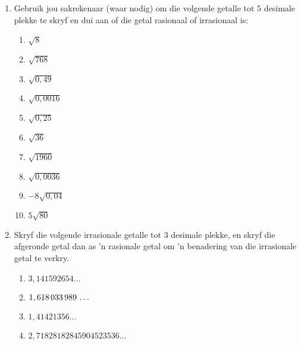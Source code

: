 \begin{eocexercises}{}
\begin{enumerate}[itemsep=5pt, label=\textbf{\arabic*}. ]
\item Gebruik jou sakrekenaar (waar nodig) om die volgende getalle tot  $5$ desimale plekke te skryf en dui aan of die getal rasionaal of irrasionaal is:
\begin{multicols}{2}
    \begin{enumerate}[itemsep=5pt, label=\textbf{\alph*}. ] 
    \item $\sqrt{8}$
    \item $\sqrt{768}$
    \item $\sqrt{0,49}$
    \item $\sqrt{0,0016}$
    \item $\sqrt{0,25}$
    \item $\sqrt{36}$
    \item $\sqrt{1960}$
    \item $\sqrt{0,0036}$
    \item $-8\sqrt{0,04}$
    \item $5\sqrt{80}$
    \end{enumerate}
\end{multicols}

\item Skryf die volgende irrasionale getalle tot $3$ desimale plekke, en skryf die afgeronde getal dan as ’n rasionale getal om ’n benadering van die irrasionale getal te verkry.
\begin{multicols}{2}
\begin{enumerate}[itemsep=5pt, label=\textbf{\alph*}. ] 
    \item $3,141592654\ldots$
    \item $1,618\phantom{\rule{0.166667em}{0ex}}033\phantom{\rule{0.166667em}{0ex}}989\phantom{\rule{0.166667em}{0ex}}\ldots$
    \item $1,41421356\ldots$
    \item $2,71828182845904523536\ldots$
    \end{enumerate}
\end{multicols}




\end{enumerate}
\end{eocexercises}
